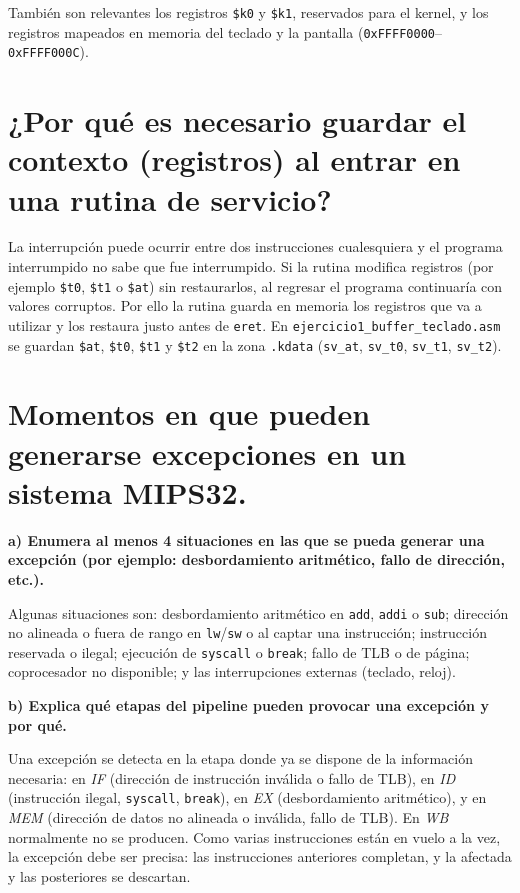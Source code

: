 \documentclass[11pt,a4paper]{article}
\begin{document}
También son relevantes los registros \texttt{\$k0} y \texttt{\$k1}, reservados para el kernel, y los registros mapeados en memoria del teclado y la pantalla (\texttt{0xFFFF0000}--\texttt{0xFFFF000C}).

\section{¿Por qué es necesario guardar el contexto (registros) al entrar en una rutina de servicio?}

La interrupción puede ocurrir entre dos instrucciones cualesquiera y el programa interrumpido no sabe que fue interrumpido. Si la rutina modifica registros (por ejemplo \texttt{\$t0}, \texttt{\$t1} o \texttt{\$at}) sin restaurarlos, al regresar el programa continuaría con valores corruptos. Por ello la rutina guarda en memoria los registros que va a utilizar y los restaura justo antes de \texttt{eret}. En \texttt{ejercicio1\_buffer\_teclado.asm} se guardan \texttt{\$at}, \texttt{\$t0}, \texttt{\$t1} y \texttt{\$t2} en la zona \texttt{.kdata} (\texttt{sv\_at}, \texttt{sv\_t0}, \texttt{sv\_t1}, \texttt{sv\_t2}).

\section{Momentos en que pueden generarse excepciones en un sistema MIPS32.}

\noindent\textbf{a) Enumera al menos 4 situaciones en las que se pueda generar una excepción (por ejemplo: desbordamiento aritmético, fallo de dirección, etc.).}

\medskip
\noindent Algunas situaciones son: desbordamiento aritmético en \texttt{add}, \texttt{addi} o \texttt{sub}; dirección no alineada o fuera de rango en \texttt{lw}/\texttt{sw} o al captar una instrucción; instrucción reservada o ilegal; ejecución de \texttt{syscall} o \texttt{break}; fallo de TLB o de página; coprocesador no disponible; y las interrupciones externas (teclado, reloj).

\medskip
\noindent\textbf{b) Explica qué etapas del pipeline pueden provocar una excepción y por qué.}

\medskip
\noindent Una excepción se detecta en la etapa donde ya se dispone de la información necesaria: en \emph{IF} (dirección de instrucción inválida o fallo de TLB), en \emph{ID} (instrucción ilegal, \texttt{syscall}, \texttt{break}), en \emph{EX} (desbordamiento aritmético), y en \emph{MEM} (dirección de datos no alineada o inválida, fallo de TLB). En \emph{WB} normalmente no se producen. Como varias instrucciones están en vuelo a la vez, la excepción debe ser precisa: las instrucciones anteriores completan, y la afectada y las posteriores se descartan.
\end{document}
